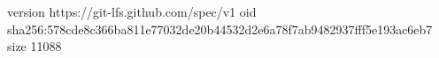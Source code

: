 version https://git-lfs.github.com/spec/v1
oid sha256:578cde8c366ba811e77032de20b44532d2e6a78f7ab9482937fff5e193ac6eb7
size 11088

